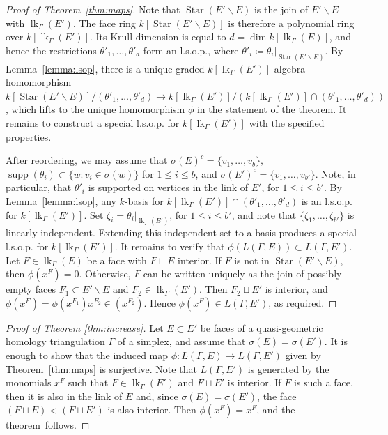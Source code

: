 \documentclass[ALCO, Unicode,published]{cedram}
\DeclareMathOperator{\lk}{lk}
\DeclareMathOperator{\Star}{Star}
\DeclareMathOperator{\supp}{supp}
\begin{document}
\begin{proof}[Proof of Theorem~\ref{thm:maps}]
Note that $\Star(E' \smallsetminus E)$ is the join of $E' \smallsetminus E$ with $\lk_{\Gamma}(E')$. The face ring $k[\Star(E' \smallsetminus E)]$ is therefore a polynomial ring over $k[\lk_\Gamma(E')]$. Its Krull dimension is equal to $d = \dim k[\lk_\Gamma(E)]$, and hence the restrictions $\theta'_1, \ldots, \theta'_d$ form an l.s.o.p., where $\theta'_i  \coloneqq  \theta_i|_{\Star(E' \smallsetminus E)}$.  By Lemma~\ref{lemma:lsop}, there is a unique graded $k[\lk_\Gamma(E')]$-algebra homomorphism $k[\Star(E' \smallsetminus E)]/(\theta'_1, \ldots, \theta'_d) \to k[\lk_\Gamma(E')]/ (k[\lk_\Gamma(E')] \cap (\theta'_1, \ldots, \theta'_d))$, which lifts to the unique homomorphism $\phi$ in the statement of the theorem. It remains to construct a special l.s.o.p. for $k[\lk_\Gamma(E')]$ with the specified properties.

After reordering, we may assume that
$\sigma(E)^c = \{ v_1, \ldots, v_b\},$ $\supp(\theta_i) \subset \{ w : v_i \in \sigma(w) \}$ for $1 \leq i \leq b$, and $\sigma(E')^c = \{v_1, \ldots, v_{b'}\}.$
Note, in particular, that $\theta'_i$ is supported on vertices in the link of $E'$, for $1 \leq i \leq b'$. By Lemma~\ref{lemma:lsop}, any $k$-basis for $k[\lk_\Gamma(E')] \cap (\theta'_1, \ldots, \theta'_d)$ is an l.s.o.p. for $k[\lk_\Gamma(E')]$.  Set $\zeta_i = \theta_i|_{\lk_\Gamma(E')}$, for $1 \leq i \leq b'$, and note that $\{\zeta_1, \ldots, \zeta_{b'}\}$ is linearly independent.  Extending this independent set to a basis produces a special l.s.o.p. for $k[\lk_\Gamma(E')]$.  It remains to verify that $\phi(L(\Gamma, E)) \subset L(\Gamma, E')$. Let $F \in \lk_{\Gamma}(E)$ be a face with $F \sqcup E$ interior. If $F$ is not in $\Star(E' \smallsetminus E)$, then $\phi(x^F) = 0$. Otherwise, $F$ can be written uniquely as the join of possibly empty faces $F_1 \subset E' \smallsetminus E$ and $F_2 \in \lk_{\Gamma}(E')$. Then $F_2 \sqcup E'$ is interior, and $\phi(x^F) = \phi(x^{F_1})x^{F_2} \in (x^{F_2})$. Hence $\phi(x^F) \in L(\Gamma,E')$, as required.
\end{proof}





\begin{proof}[Proof of Theorem \ref{thm:increase}]
Let $E \subset E'$ be faces of a 
quasi-geometric homology triangulation $\Gamma$ of a simplex, and assume that $\sigma(E) = \sigma(E')$. It is enough to show that the induced map $\phi \colon L(\Gamma, E) \to L(\Gamma,E')$ given by Theorem~\ref{thm:maps} is surjective. Note that $L(\Gamma,E')$ is generated by the monomials $x^F$ such that $F \in \lk_\Gamma(E')$ and $F \sqcup E'$ is interior.  If $F$ is such a face, then it is also in the link of $E$ and, since $\sigma(E) = \sigma(E')$, the face $(F \sqcup E) < (F \sqcup E')$ is also interior.  Then $\phi(x^F) = x^F$, and the theorem~follows. \end{proof}
\end{document}
